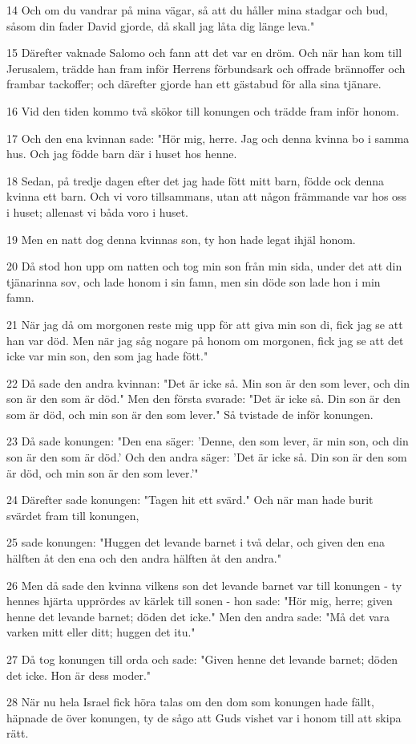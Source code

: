 \par 14 Och om du vandrar på mina vägar, så att du håller mina stadgar och bud, såsom din fader David gjorde, då skall jag låta dig länge leva."
\par 15 Därefter vaknade Salomo och fann att det var en dröm. Och när han kom till Jerusalem, trädde han fram inför Herrens förbundsark och offrade brännoffer och frambar tackoffer; och därefter gjorde han ett gästabud för alla sina tjänare.
\par 16 Vid den tiden kommo två skökor till konungen och trädde fram inför honom.
\par 17 Och den ena kvinnan sade: "Hör mig, herre. Jag och denna kvinna bo i samma hus. Och jag födde barn där i huset hos henne.
\par 18 Sedan, på tredje dagen efter det jag hade fött mitt barn, födde ock denna kvinna ett barn. Och vi voro tillsammans, utan att någon främmande var hos oss i huset; allenast vi båda voro i huset.
\par 19 Men en natt dog denna kvinnas son, ty hon hade legat ihjäl honom.
\par 20 Då stod hon upp om natten och tog min son från min sida, under det att din tjänarinna sov, och lade honom i sin famn, men sin döde son lade hon i min famn.
\par 21 När jag då om morgonen reste mig upp för att giva min son di, fick jag se att han var död. Men när jag såg nogare på honom om morgonen, fick jag se att det icke var min son, den som jag hade fött."
\par 22 Då sade den andra kvinnan: "Det är icke så. Min son är den som lever, och din son är den som är död." Men den första svarade: "Det är icke så. Din son är den som är död, och min son är den som lever." Så tvistade de inför konungen.
\par 23 Då sade konungen: "Den ena säger: 'Denne, den som lever, är min son, och din son är den som är död.' Och den andra säger: 'Det är icke så. Din son är den som är död, och min son är den som lever.'"
\par 24 Därefter sade konungen: "Tagen hit ett svärd." Och när man hade burit svärdet fram till konungen,
\par 25 sade konungen: "Huggen det levande barnet i två delar, och given den ena hälften åt den ena och den andra hälften åt den andra."
\par 26 Men då sade den kvinna vilkens son det levande barnet var till konungen - ty hennes hjärta upprördes av kärlek till sonen - hon sade: "Hör mig, herre; given henne det levande barnet; döden det icke." Men den andra sade: "Må det vara varken mitt eller ditt; huggen det itu."
\par 27 Då tog konungen till orda och sade: "Given henne det levande barnet; döden det icke. Hon är dess moder."
\par 28 När nu hela Israel fick höra talas om den dom som konungen hade fällt, häpnade de över konungen, ty de sågo att Guds vishet var i honom till att skipa rätt.

